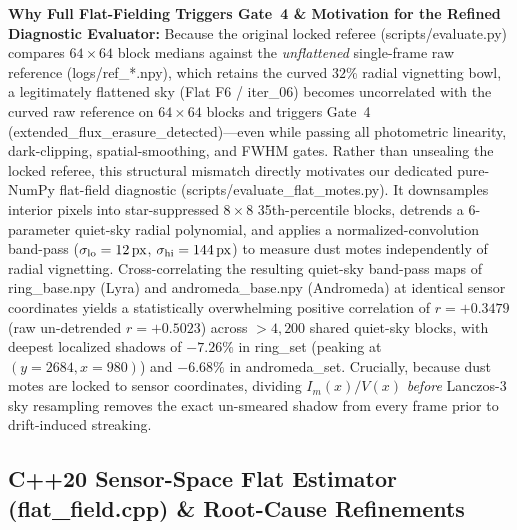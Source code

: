 \documentclass[10pt,twocolumn,letterpaper]{article}
\DeclareRobustCommand{\code}[1]{\texttt{#1}}
\def\code#1{#1}%
\def\bm#1{#1}%
\def\allowbreak{}%
\begin{document}
\noindent\textbf{Why Full Flat-Fielding Triggers Gate~4 \& Motivation for the Refined Diagnostic Evaluator:}
Because the original locked referee (\code{scripts/\allowbreak evaluate.py}) compares $64\times 64$ block medians against the \emph{unflattened} single-frame raw reference (\code{logs/ref\_*.npy}), which retains the curved $32\%$ radial vignetting bowl, a legitimately flattened sky (\code{Flat F6} / \code{iter\_06}) becomes uncorrelated with the curved raw reference on $64\times 64$ blocks and triggers Gate~4 (\code{extended\_flux\_erasure\_detected})---even while passing all photometric linearity, dark-clipping, spatial-smoothing, and FWHM gates. Rather than unsealing the locked referee, this structural mismatch directly motivates our dedicated pure-NumPy flat-field diagnostic (\code{scripts/\allowbreak evaluate\_flat\_motes.py}). It downsamples interior pixels into star-suppressed $8\times 8$ 35th-percentile blocks, detrends a 6-parameter quiet-sky radial polynomial, and applies a normalized-convolution band-pass ($\sigma_{\text{lo}} = 12\text{\,px}$, $\sigma_{\text{hi}} = 144\text{\,px}$) to measure dust motes independently of radial vignetting. Cross-correlating the resulting quiet-sky band-pass maps of \code{ring\_base.npy} (Lyra) and \code{andromeda\_base.npy} (Andromeda) at identical sensor coordinates yields a statistically overwhelming positive correlation of \textbf{$r = +0.3479$} (raw un-detrended $r = +0.5023$) across $>4{,}200$ shared quiet-sky blocks, with deepest localized shadows of \textbf{$-7.26\%$} in \code{ring\_set} (peaking at $(y=2684, x=980)$) and \textbf{$-6.68\%$} in \code{andromeda\_set}. Crucially, because dust motes are locked to sensor coordinates, dividing $I_m(\bm{x}) / V(\bm{x})$ \emph{before} Lanczos-3 sky resampling removes the exact un-smeared shadow from every frame prior to drift-induced streaking.

\subsection{C++20 Sensor-Space Flat Estimator (\code{flat\_field.cpp}) \& Root-Cause Refinements}
\end{document}
